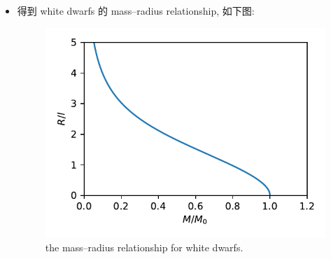 \begin{itemize}
	\item 得到 white dwarfs 的 mass--radius relationship, 如下图:
	\begin{figure}[H]
		\centering
		\includegraphics[scale=0.8]{figures/the mass--radius relationship for white dwarfs.pdf}
		\caption{the mass--radius relationship for white dwarfs.}
	\end{figure}
\end{itemize}
